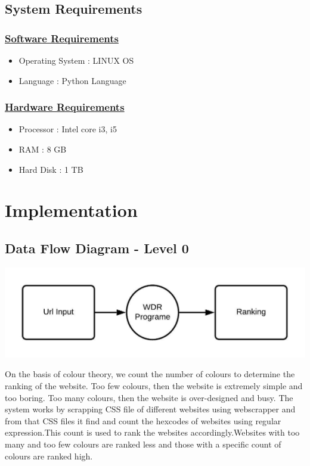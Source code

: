 \documentclass{fisatproject}
\begin{document}
\subsection{System Requirements}
\subsubsection{\underline{Software Requirements}}
\begin{itemize}
	\item Operating System : LINUX OS 
	
	\item Language : Python Language
\end{itemize}

\subsubsection{\underline{Hardware Requirements}}
\begin{itemize}
	\item Processor : Intel core i3, i5 
	\item RAM : 8 GB
	\item Hard Disk : 1 TB
	
\end{itemize}


\section{Implementation}
\subsection{Data Flow Diagram - Level 0}
\begin{flushleft}
	\centerline{\includegraphics[scale=1.2]{image/level_0_dfd.jpeg}}
\end{flushleft}

On the basis of colour theory, we count the number of
colours to determine the ranking of the website.
Too few colours, then the website is extremely simple and too
boring.
Too many colours, then the website is over-designed and busy.
The system works by scrapping CSS file of different websites using webscrapper and from that CSS files it find and count the hexcodes of websites using regular expression.This count is used to rank the websites accordingly.Websites with too many and too few colours are ranked less and those with a specific count of colours are ranked high.  
\end{document}

